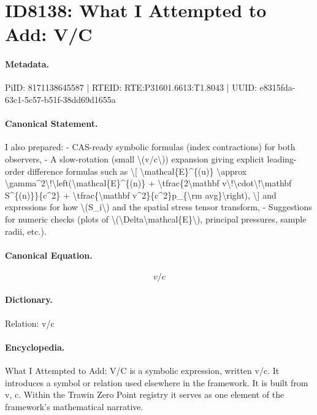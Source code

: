 \section*{ID8138: What I Attempted to Add: V/C}
\paragraph{Metadata.}
PiID: 8171138645587 | RTEID: RTE:P31601.6613:T1.8043 | UUID: e8315fda-63c1-5c57-b51f-38dd69d1655a

\paragraph{Canonical Statement.}
I also prepared: - CAS-ready symbolic formulas (index contractions) for both observers, - A slow-rotation (small \textbackslash{}(v/c\textbackslash{})) expansion giving explicit leading-order difference formulas such as \textbackslash{}[ \textbackslash{}mathcal\{E\}\textasciicircum{}\{(u)\} \textbackslash{}approx \textbackslash{}gamma\textasciicircum{}2\textbackslash{}!\textbackslash{}left(\textbackslash{}mathcal\{E\}\textasciicircum{}\{(n)\} + \textbackslash{}tfrac\{2\textbackslash{}mathbf v\textbackslash{}!\textbackslash{}cdot\textbackslash{}!\textbackslash{}mathbf S\textasciicircum{}\{(n)\}\}\{c\textasciicircum{}2\} + \textbackslash{}tfrac\{\textbackslash{}mathbf v\textasciicircum{}2\}\{c\textasciicircum{}2\}p\_\{\textbackslash{}rm avg\}\textbackslash{}right), \textbackslash{}] and expressions for how \textbackslash{}(S\_i\textbackslash{}) and the spatial stress tensor transform, - Suggestions for numeric checks (plots of \textbackslash{}(\textbackslash{}Delta\textbackslash{}mathcal\{E\}\textbackslash{}), principal pressures, sample radii, etc.).

\paragraph{Canonical Equation.}
\[
v/c
\]

\paragraph{Dictionary.}
Relation: v/c

\paragraph{Encyclopedia.}
What I Attempted to Add: V/C is a symbolic expression, written v/c. It introduces a symbol or relation used elsewhere in the framework. It is built from v, c. Within the Trawin Zero Point registry it serves as one element of the framework's mathematical narrative.
